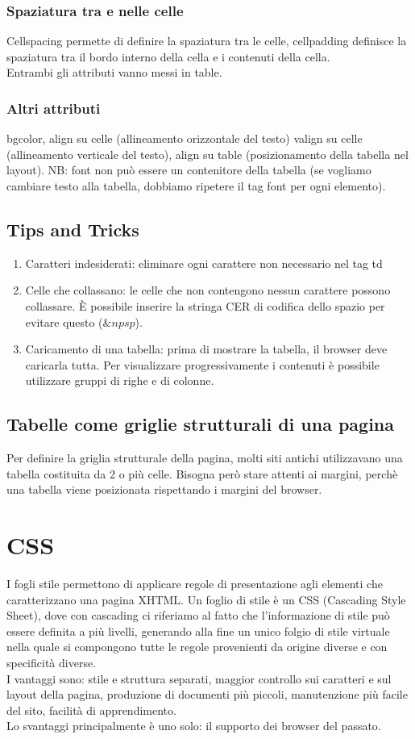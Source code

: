 \documentclass{article}
\begin{document}
\subsubsection{Spaziatura tra e nelle celle}
Cellspacing permette di definire la spaziatura tra le celle, cellpadding definisce la spaziatura tra il bordo interno della cella e i contenuti della cella.\\
Entrambi gli attributi vanno messi in table.
\subsubsection{Altri attributi}
bgcolor, align su celle (allineamento orizzontale del testo) valign su celle (allineamento verticale del testo), align su table (posizionamento della tabella nel layout).
NB: font non può essere un contenitore della tabella (se vogliamo cambiare testo alla tabella, dobbiamo ripetere il tag font per ogni elemento).
\subsection{Tips and Tricks}
\begin{enumerate}
	\item Caratteri indesiderati: eliminare ogni carattere non necessario nel tag td
	\item Celle che collassano: le celle che non contengono nessun carattere possono collassare. È possibile inserire la stringa CER di codifica dello spazio per evitare questo ($\& npsp$).
	\item Caricamento di una tabella: prima di mostrare la tabella, il browser deve caricarla tutta. Per visualizzare progressivamente i contenuti è possibile utilizzare gruppi di righe e di colonne.
\end{enumerate}
\subsection{Tabelle come griglie strutturali di una pagina}
Per definire la griglia strutturale della pagina, molti siti antichi utilizzavano una tabella costituita da 2 o più celle.  Bisogna però stare attenti ai margini, perchè una tabella viene posizionata rispettando i margini del browser.
\section{CSS}
I fogli stile permettono di applicare regole di presentazione agli elementi che caratterizzano una pagina XHTML. Un foglio di stile è un CSS (Cascading Style Sheet), dove con cascading ci riferiamo al fatto che l'informazione di stile può essere definita a più livelli, generando alla fine un unico folgio di stile virtuale nella quale si compongono tutte le regole provenienti da origine diverse e con specificità diverse.\\
I vantaggi sono: stile e struttura separati, maggior controllo sui caratteri e sul layout della pagina, produzione di documenti più piccoli, manutenzione più facile del sito, facilità di apprendimento.\\
Lo svantaggi principalmente è uno solo: il supporto dei browser del passato.
\end{document}
